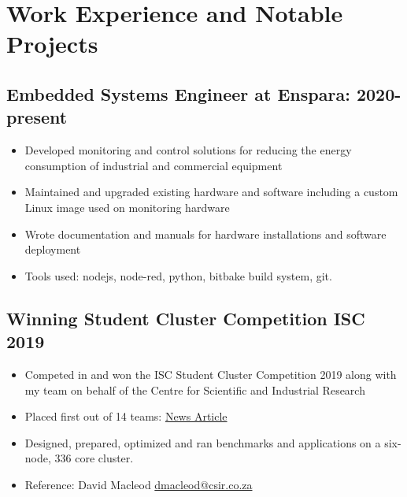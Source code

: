 \documentclass[10pt,a4paper,notitlepage]{article}
\begin{document}
\section*{Work Experience and Notable Projects}

\subsection*{Embedded Systems Engineer at Enspara: 2020-present}
\begin{itemize}
	\setlength\itemsep{0.02em}
    \item Developed monitoring and control solutions for reducing the energy consumption of industrial and commercial equipment
    \item Maintained and upgraded existing hardware and software including a custom Linux image used on monitoring hardware
    \item Wrote documentation and manuals for hardware installations and software deployment
    \item Tools used: nodejs, node-red, python, bitbake build system, git.
\end{itemize}

\subsection*{Winning Student Cluster Competition ISC 2019}
\begin{itemize}
	\setlength\itemsep{0.02em}
    \item Competed in and won the ISC Student Cluster Competition 2019 along with my team on behalf of the Centre for Scientific and Industrial Research
    \item Placed first out of 14 teams: \href{https://www.chpc.ac.za/index.php/news2/241-south-africa-wins-international-student-cluster-competition-for-the-fourth-time}{News Article}
    \item Designed, prepared, optimized and ran benchmarks and applications on a six-node, 336 core cluster.
    \item Reference: David Macleod \href{mailto:dmacleod@csir.co.za}{dmacleod@csir.co.za}
\end{itemize}
\end{document}
